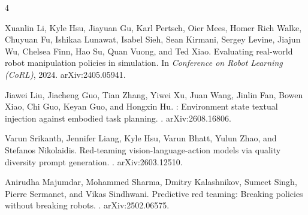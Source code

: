 \documentclass{article}
\begin{document}

\begin{thebibliography}{4}

Xuanlin Li, Kyle Hsu, Jiayuan Gu, Karl Pertsch, Oier Mees, Homer Rich Walke, Chuyuan Fu, Ishikaa
Lunawat, Isabel Sieh, Sean Kirmani, Sergey Levine, Jiajun Wu, Chelsea Finn, Hao Su, Quan Vuong, and
Ted Xiao.
\newblock Evaluating real-world robot manipulation policies in simulation.
\newblock In \emph{Conference on Robot Learning (CoRL)}, 2024.
\newblock arXiv:2405.05941.

Jiawei Liu, Jiacheng Guo, Tian Zhang, Yiwei Xu, Juan Wang, Jinlin Fan, Bowen Xiao, Chi Guo, Keyan
Guo, and Hongxin Hu.
: Environment state textual injection against embodied task planning.
.
\newblock arXiv:2608.16806.

Varun Srikanth, Jennifer Liang, Kyle Hsu, Varun Bhatt, Yulun Zhao, and Stefanos Nikolaidis.
\newblock Red-teaming vision-language-action models via quality diversity prompt generation.
.
\newblock arXiv:2603.12510.

Anirudha Majumdar, Mohammed Sharma, Dmitry Kalashnikov, Sumeet Singh, Pierre Sermanet, and Vikas
Sindhwani.
\newblock Predictive red teaming: Breaking policies without breaking robots.
.
\newblock arXiv:2502.06575.

\end{thebibliography}
\end{document}
